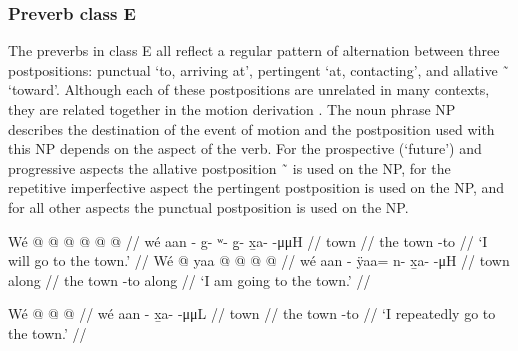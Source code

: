 \subsubsection{Preverb class E}\label{sec:inventory-preverb-E}

The preverbs in class E all reflect a regular pattern of alternation between three postpositions:
	punctual  ‘to, arriving at’,
	pertingent  ‘at, contacting’,
	and allative  \~\  ‘toward’.
Although each of these postpositions are unrelated in many contexts,
	they are related together in the motion derivation
	.
The noun phrase NP describes the destination of the event of motion
	and the postposition used with this NP depends on the aspect of the verb.
For the prospective (‘future’) and progressive aspects the allative postposition  \~\ 
	is used on the NP,
	for the repetitive imperfective aspect the pertingent postposition  is used on the NP,
	and for all other aspects the punctual postposition  is used on the NP.

\pex\label{ex:inventory-preverb-F-prospprog}%
\a\label{ex:inventory-preverb-F-prospprog-prosp}%
\begingl
	\gla	Wé  @ {}  @ {} @ {} @ {} @ {} @ {} //
	\glb	wé aan - g- ʷ- g̱- x̱a-  -μμH //
	\glc	{} town \· \· \· \· \·  \· //
	\gld	the town -to  {} {} {} {} {} //
	\glft	‘I will go to the town.’
		//
\endgl
\a\label{ex:inventory-preverb-F-prospprog-prog}%
\begingl
	\gla	Wé  @ {} yaa @  @ {} @ {} @ {} //
	\glb	wé aan - ÿaa= n- x̱a-  -μH //
	\glc	{} town \· along\· \· \·  \· //
	\gld	the town -to along\·  {} {} {} //
	\glft	‘I am going to the town.’
		//
\endgl
\xe

\ex\label{ex:inventory-preverb-F-repimpfv}%
\begingl
	\gla	Wé  @ {}  @ {} @ {} //
	\glb	wé aan - x̱a-  -μμL //
	\glc	{} town \· \·  \· //
	\gld	the town -to  {} {} //
	\glft	‘I repeatedly go to the town.’
		//
\endgl
\xe

